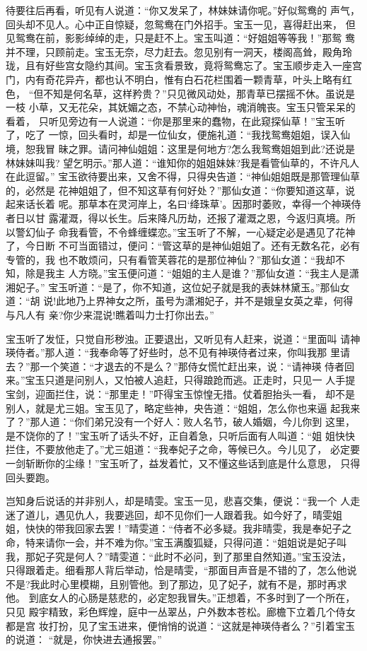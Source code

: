 待要往后再看，听见有人说道：“你又发呆了，林妹妹请你呢。”好似鸳鸯的
声气，回头却不见人。心中正自惊疑，忽鸳鸯在门外招手。宝玉一见，喜得赶出来，
但见鸳鸯在前，影影绰绰的走，只是赶不上。宝玉叫道：“好姐姐等等我！”那鸳
鸯并不理，只顾前走。宝玉无奈，尽力赶去。忽见别有一洞天，楼阁高耸，殿角玲
珑，且有好些宫女隐约其间。宝玉贪看景致，竟将鸳鸯忘了。宝玉顺步走入一座宫
门，内有奇花异卉，都也认不明白，惟有白石花栏围着一颗青草，叶头上略有红色，
“但不知是何名草，这样矜贵？”只见微风动处，那青草已摆摇不休。虽说是一枝
小草，又无花朵，其妩媚之态，不禁心动神怡，魂消魄丧。宝玉只管呆呆的看着，
只听见旁边有一人说道：“你是那里来的蠢物，在此窥探仙草！”宝玉听了，吃了
一惊，回头看时，却是一位仙女，便施礼道：“我找鸳鸯姐姐，误入仙境，恕我冒
昧之罪。请问神仙姐姐：这里是何地方?怎么我鸳鸯姐姐到此?还说是林妹妹叫我?
望乞明示。”那人道：“谁知你的姐姐妹妹?我是看管仙草的，不许凡人在此逗留。”
宝玉欲待要出来，又舍不得，只得央告道：“神仙姐姐既是那管理仙草的，必然是
花神姐姐了，但不知这草有何好处？”那仙女道：“你要知道这草，说起来话长着
呢。那草本在灵河岸上，名曰‘绛珠草’。因那时萎败，幸得一个神瑛侍者日以甘
露灌溉，得以长生。后来降凡历劫，还报了灌溉之恩，今返归真境。所以警幻仙子
命我看管，不令蜂缠蝶恋。”宝玉听了不解，一心疑定必是遇见了花神了，今日断
不可当面错过，便问：“管这草的是神仙姐姐了。还有无数名花，必有专管的，我
也不敢烦问，只有看管芙蓉花的是那位神仙？”那仙女道：“我却不知，除是我主
人方晓。”宝玉便问道：“姐姐的主人是谁？”那仙女道：“我主人是潇湘妃子。”
宝玉听道：“是了，你不知道，这位妃子就是我的表妹林黛玉。”那仙女道：“胡
说!此地乃上界神女之所，虽号为潇湘妃子，并不是娥皇女英之辈，何得与凡人有
亲?你少来混说!瞧着叫力士打你出去。”

宝玉听了发怔，只觉自形秽浊。正要退出，又听见有人赶来，说道：“里面叫
请神瑛侍者。”那人道：“我奉命等了好些时，总不见有神瑛侍者过来，你叫我那
里请去？”那一个笑道：“才退去的不是么？”那侍女慌忙赶出来，说：“请神瑛
侍者回来。”宝玉只道是问别人，又怕被人追赶，只得踉跄而逃。正走时，只见一
人手提宝剑，迎面拦住，说：“那里走！”吓得宝玉惊惶无措。仗着胆抬头一看，
却不是别人，就是尤三姐。宝玉见了，略定些神，央告道：“姐姐，怎么你也来逼
起我来了？”那人道：“你们弟兄没有一个好人：败人名节，破人婚姻，今儿你到
这里，是不饶你的了！”宝玉听了话头不好，正自着急，只听后面有人叫道：“姐
姐快快拦住，不要放他走了。”尤三姐道：“我奉妃子之命，等候已久。今儿见了，
必定要一剑斩断你的尘缘！”宝玉听了，益发着忙，又不懂这些话到底是什么意思，
只得回头要跑。

岂知身后说话的并非别人，却是晴雯。宝玉一见，悲喜交集，便说：“我一个
人走迷了道儿，遇见仇人，我要逃回，却不见你们一人跟着我。如今好了，晴雯姐
姐，快快的带我回家去罢！”晴雯道：“侍者不必多疑。我非晴雯，我是奉妃子之
命，特来请你一会，并不难为你。”宝玉满腹狐疑，只得问道：“姐姐说是妃子叫
我，那妃子究是何人？”晴雯道：“此时不必问，到了那里自然知道。”宝玉没法，
只得跟着走。细看那人背后举动，恰是晴雯，“那面目声音是不错的了，怎么他说
不是?我此时心里模糊，且别管他。到了那边，见了妃子，就有不是，那时再求他。
到底女人的心肠是慈悲的，必定恕我冒失。”正想着，不多时到了一个所在，只见
殿宇精致，彩色辉煌，庭中一丛翠丛，户外数本苍松。廊檐下立着几个侍女都是宫
妆打扮，见了宝玉进来，便悄悄的说道：“这就是神瑛侍者么？”引着宝玉的说道：
“就是，你快进去通报罢。”

